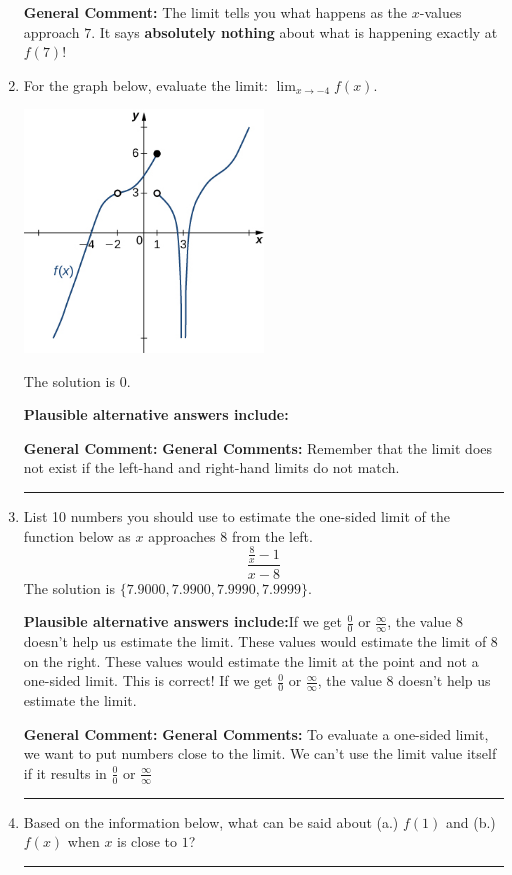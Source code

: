 \documentclass{extbook}[14pt]
\newcommand{\litem}[1]{\item #1

\rule{\textwidth}{0.4pt}}
\begin{document}
\begin{enumerate}
{\begin{enumerate}[label=\Alph*.]
\end{enumerate}

\textbf{General Comment:} The limit tells you what happens as the $x$-values approach $7$. It says \textbf{absolutely nothing} about what is happening exactly at $f(7)$!
}
\litem{
For the graph below, evaluate the limit: $ \displaystyle \lim_{x \rightarrow -4} f(x)$.

\begin{center}
    \includegraphics[width=0.5\textwidth]{../Figures/evaluateLimitGraphicallyB.png}
\end{center}


The solution is \( 0 \).\begin{enumerate}[label=\Alph*.]
\textbf{Plausible alternative answers include:}




\end{enumerate}

\textbf{General Comment:} \textbf{General Comments:} Remember that the limit does not exist if the left-hand and right-hand limits do not match.
}
\litem{
List 10 numbers you should use to estimate the one-sided limit of the function below as $x$ approaches 8 from the left.
\[ \frac{\frac{8}{x} - 1}{x - 8} \]The solution is \( \{ 7.9000, 7.9900, 7.9990, 7.9999 \} \).\begin{enumerate}[label=\Alph*.]
\textbf{Plausible alternative answers include:}If we get $\frac{0}{0}$ or $\frac{\infty}{\infty}$, the value 8 doesn't help us estimate the limit.
These values would estimate the limit of 8 on the right.
These values would estimate the limit at the point and not a one-sided limit.
This is correct!
If we get $\frac{0}{0}$ or $\frac{\infty}{\infty}$, the value 8 doesn't help us estimate the limit.
\end{enumerate}

\textbf{General Comment:} \textbf{General Comments:} To evaluate a one-sided limit, we want to put numbers close to the limit. We can't use the limit value itself if it results in $\frac{0}{0}$ or $\frac{\infty}{\infty}$
}
\litem{
Based on the information below, what can be said about (a.) $f(1)$ and (b.) $f(x)$ when $x$ is close to $1$?

}
\end{enumerate}
\end{document}
